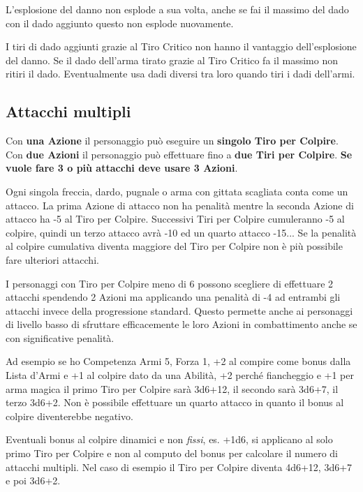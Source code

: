 \begin{multicols}{2}
L'esplosione del danno non esplode a sua volta, anche se fai il massimo del dado con il dado aggiunto questo non esplode nuovamente.

I tiri di dado aggiunti grazie al Tiro Critico non hanno il vantaggio dell'esplosione del danno. Se il dado dell'arma tirato grazie al Tiro Critico fa il massimo non ritiri il dado. Eventualmente usa dadi diversi tra loro quando tiri i dadi dell'armi.


\subsection{Attacchi multipli}\label{attacchimultiplimischia}\hypertarget{attacchimultiplimischia}{}
Con \textbf{una Azione} il personaggio può eseguire un \textbf{singolo Tiro per Colpire}.
Con \textbf{due Azioni} il personaggio può effettuare fino a \textbf{due Tiri per Colpire}. \textbf{Se vuole fare 3 o più attacchi deve usare 3 Azioni}.

Ogni singola freccia, dardo, pugnale o arma con gittata scagliata conta come un attacco.
La prima Azione di attacco non ha penalità mentre la seconda Azione di attacco ha -5 al Tiro per Colpire. Successivi Tiri per Colpire cumuleranno -5 al colpire, quindi un terzo attacco avrà -10 ed un quarto attacco -15...
Se la penalità al colpire cumulativa diventa maggiore del Tiro per Colpire non è più possibile fare ulteriori attacchi.

I personaggi con Tiro per Colpire meno di 6 possono scegliere di effettuare 2 attacchi spendendo 2 Azioni ma applicando una penalità di -4 ad entrambi gli attacchi invece della progressione standard. Questo permette anche ai personaggi di livello basso di sfruttare efficacemente le loro Azioni in combattimento anche se con significative penalità.

\begin{giocatore}
Ad esempio se ho Competenza Armi 5, Forza 1, +2 al compire come bonus dalla Lista d'Armi e +1 al colpire dato da una Abilità, +2 perché fiancheggio e +1 per arma magica il primo Tiro per Colpire sarà 3d6+12, il secondo sarà 3d6+7, il terzo 3d6+2. Non è possibile effettuare un quarto attacco in quanto il bonus al colpire diventerebbe negativo.
\end{giocatore}

Eventuali bonus al colpire dinamici e non \emph{fissi}, es. +1d6, si applicano al solo primo Tiro per Colpire e non al computo del bonus per calcolare il numero di attacchi multipli. Nel caso di esempio il Tiro per Colpire diventa 4d6+12, 3d6+7 e poi 3d6+2.


\end{multicols}
